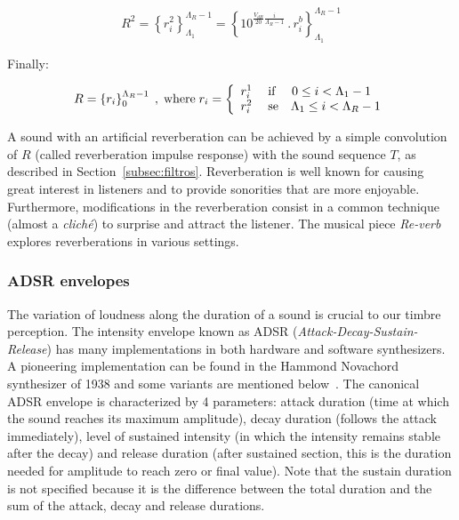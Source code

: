 \begin{equation}\label{eq:p2rev}
    R^2=\left\{r_i^2\right\}_{\Lambda_1}^{\Lambda_R-1}=\left\{10^{\frac{V_{dB}}{20}\frac{i}{\Lambda_R-1}}\,.\,r_i^b\right\}_{\Lambda_1}^{\Lambda_R-1}
\end{equation}

Finally:

\begin{equation}\label{eq:rev}
	R=\left\{r_i\right\}_0^{\Lambda_R-1}\;,\; \text{where} \; r_i=\left\{
        \begin{array}{l l}
            r_i^1\;  & \text{if }\quad 0\leq i<\Lambda_1-1 \\
                                     r_i^2 \; & \text{se}\quad \Lambda_1 \leq i < \Lambda_R-1 \\
        \end{array} \right.
\end{equation}

A sound with an artificial reverberation can be achieved by a simple convolution of $R$ (called reverberation impulse response) with the sound sequence $T$, as described in Section~\ref{subsec:filtros}. Reverberation is well known for causing great interest in listeners and to provide sonorities that are more enjoyable. Furthermore, modifications in the reverberation consist in a common technique (almost a \textit{clich\'{e}}) to surprise and attract the listener. The musical piece \emph{Re-verb} explores reverberations in various settings.~\cite{MASSA}

\subsubsection{ADSR envelopes}
The variation of loudness along the duration of a sound is crucial to our timbre perception.
The intensity envelope known as ADSR (\emph{Attack-Decay-Sustain-Release}) has many implementations in both hardware and software synthesizers. A pioneering implementation can be found in the Hammond Novachord synthesizer of 1938 and some variants are mentioned below~\cite{ADSR}. The canonical ADSR envelope is characterized by 4 parameters: attack duration (time at which the sound reaches its maximum amplitude), decay duration (follows the attack immediately), level of sustained intensity (in which the intensity remains stable after the decay) and release duration (after sustained section, this is the duration needed for amplitude to reach zero or final value).
Note that the sustain duration is not specified because it is the difference between the total duration and the sum of the attack, decay and release durations.


